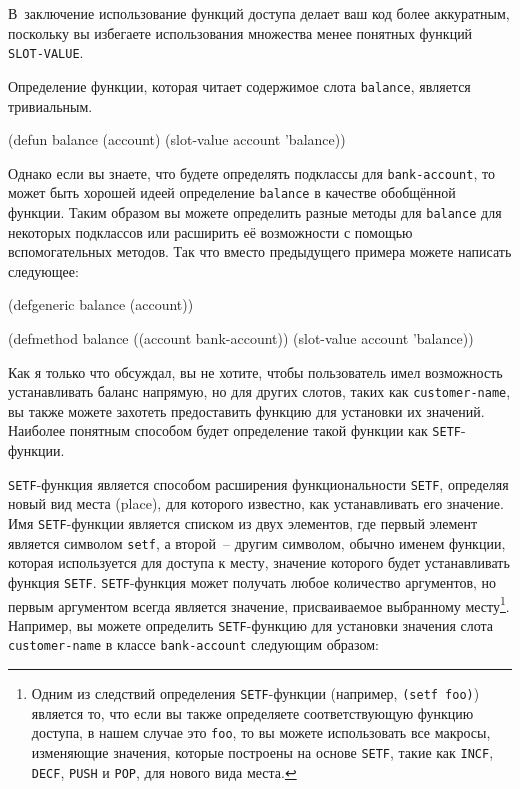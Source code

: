В~заключение использование функций доступа делает ваш код более аккуратным, поскольку вы
избегаете использования множества менее понятных функций \lstinline{SLOT-VALUE}.

Определение функции, которая читает содержимое слота \lstinline{balance}, является тривиальным.

\begin{myverb}
(defun balance (account)
  (slot-value account 'balance))
\end{myverb}

Однако если вы знаете, что будете определять подклассы для \lstinline{bank-account}, то
может быть хорошей идеей определение \lstinline{balance} в качестве обобщённой функции.  Таким
образом вы можете определить разные методы для \lstinline{balance} для некоторых подклассов
или расширить её возможности с помощью вспомогательных методов. Так что вместо предыдущего
примера можете написать следующее:

\begin{myverb}
(defgeneric balance (account))

(defmethod balance ((account bank-account))
  (slot-value account 'balance))
\end{myverb}

Как я только что обсуждал, вы не хотите, чтобы пользователь имел возможность устанавливать
баланс напрямую, но для других слотов, таких как \lstinline{customer-name}, вы также можете
захотеть предоставить функцию для установки их значений.  Наиболее понятным способом будет
определение такой функции как \lstinline{SETF}-функции.

\lstinline{SETF}-функция является способом расширения функциональности \lstinline{SETF}, определяя
новый вид места (place), для которого известно, как устанавливать его значение.  Имя
\lstinline{SETF}-функции является списком из двух элементов, где первый элемент является
символом \lstinline{setf}, а второй~-- другим символом, обычно именем функции, которая
используется для доступа к месту, значение которого будет устанавливать функция
\lstinline{SETF}.  \lstinline{SETF}-функция может получать любое количество аргументов, но первым
аргументом всегда является значение, присваиваемое выбранному месту\footnote{Одним из
  следствий определения \lstinline{SETF}-функции (например, \lstinline{(setf foo)}) является то, что
  если вы также определяете соответствующую функцию доступа, в нашем случае это
  \lstinline{foo}, то вы можете использовать все макросы, изменяющие значения, которые построены
  на основе \lstinline{SETF}, такие как \lstinline{INCF}, \lstinline{DECF}, \lstinline{PUSH} и \lstinline{POP}, для
  нового вида места.}.  Например, вы можете определить \lstinline{SETF}-функцию для установки
значения слота \lstinline{customer-name} в классе \lstinline{bank-account} следующим образом:

